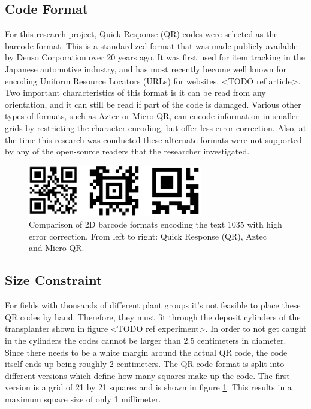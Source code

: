\subsection{Code Format}
\label{section:code_format}

For this research project, Quick Response (QR) codes were selected as the barcode format. This is a standardized format that was made publicly available by Denso Corporation over 20 years ago.  It was first used for item tracking in the Japanese automotive industry, and has most recently become well known for encoding Uniform Resource Locators (URLs) for websites. <TODO ref article>.  Two important characteristics of this format is it can be read from any orientation, and it can still be read if part of the code is damaged.  Various other types of formats, such as Aztec or Micro QR, can encode information in smaller grids by restricting the character encoding, but offer less error correction.  Also, at the time this research was conducted these alternate formats were not supported by any of the open-source readers that the researcher investigated. 

\begin{figure}[htb]
	\centering
    \includegraphics[width=3in]{figures/generated_codes_1035.png}
    \caption[2D barcode formats]{Comparison of 2D barcode formats encoding the text 1035 with high error correction.  From left to right: Quick Response (QR), Aztec and Micro QR.}
    \label{barcode_formats}
\end{figure} 

\subsection{Size Constraint}

For fields with thousands of different plant groups it's not feasible to place these QR codes by hand.  Therefore, they must fit through the deposit cylinders of the transplanter shown in figure <TODO ref experiment>.  In order to not get caught in the cylinders the codes cannot be larger than 2.5 centimeters in diameter. Since there needs to be a white margin around the actual QR code, the code itself ends up being roughly 2 centimeters.  The QR code format is split into different versions which define how many squares make up the code.  The first version is a grid of 21 by 21 squares and is shown in figure \ref{barcode_formats}.  This results in a maximum square size of only 1 millimeter.  


